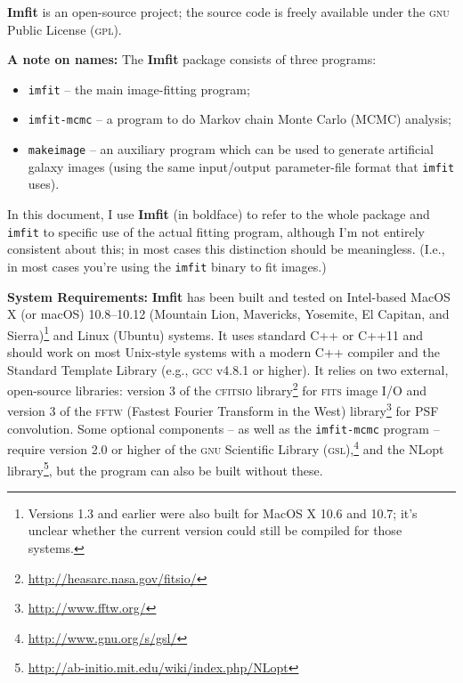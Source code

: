 \documentclass[10pt,a4paper,article]{memoir}
\newcommand{\imfit}{\textbf{Imfit}}
\newcommand{\Imfit}{\textbf{Imfit}}
\newcommand{\imfitprog}{\texttt{imfit}}
\newcommand{\imfitmcmc}{\texttt{imfit-mcmc}}
\newcommand{\makeimage}{\texttt{makeimage}}
\begin{document}
\Imfit{} is an open-source project; the source code is freely available
under the \textsc{gnu} Public License (\textsc{gpl}).


\bigskip

\textbf{A note on names:} The \imfit{} package consists of three programs:
\begin{itemize}
\item \imfitprog{} -- the main image-fitting program; \\
\item \imfitmcmc{} -- a program to do Markov chain Monte Carlo (MCMC) analysis; \\
\item \makeimage{} -- an auxiliary program which can be used to
generate artificial galaxy images (using the same input/output
parameter-file format that \imfitprog{} uses). \\
\end{itemize}
In this document, I use \imfit{} (in boldface) to refer to the whole
package and \imfitprog{} to specific use of the actual fitting program,
although I'm not entirely consistent about this; in most cases this
distinction should be meaningless. (I.e., in most cases you're using the
\imfitprog{} binary to fit images.)


\bigskip

\textbf{System Requirements:} \Imfit{} has been built and tested on
Intel-based MacOS X (or macOS) 10.8--10.12 (Mountain Lion, Mavericks,
Yosemite, El Capitan, and Sierra)\footnote{Versions 1.3 and earlier were
also built for MacOS X 10.6 and 10.7; it's unclear whether the current
version could still be compiled for those systems.} and Linux (Ubuntu)
systems. It uses standard C++ or C++11 and should work on most
Unix-style systems with a modern C++ compiler and the Standard Template
Library (e.g., \textsc{gcc} v4.8.1 or higher). It relies on two
external, open-source libraries: version 3 of the \textsc{cfitsio}
library\footnote{\url{http://heasarc.nasa.gov/fitsio/}} for
\textsc{fits} image I/O and version 3 of the \textsc{fftw} (Fastest
Fourier Transform in the West)
library\footnote{\url{http://www.fftw.org/}} for PSF convolution. Some
optional components -- as well as the \imfitmcmc{} program -- require
version 2.0 or higher of the \textsc{gnu} Scientific Library
(\textsc{gsl}),\footnote{\url{http://www.gnu.org/s/gsl/}} and the NLopt
library\footnote{\url{http://ab-initio.mit.edu/wiki/index.php/NLopt}},
but the program can also be built without these.

\bigskip
\end{document}
